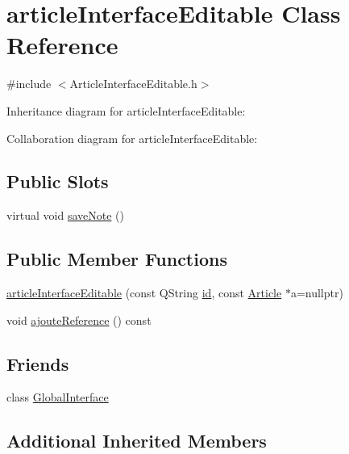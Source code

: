 \hypertarget{classarticleInterfaceEditable}{}\section{article\+Interface\+Editable Class Reference}
\label{classarticleInterfaceEditable}


{\ttfamily \#include $<$Article\+Interface\+Editable.\+h$>$}



Inheritance diagram for article\+Interface\+Editable\+:


Collaboration diagram for article\+Interface\+Editable\+:
\subsection*{Public Slots}
\begin{DoxyCompactItemize}
\item 
virtual void \hyperlink{classarticleInterfaceEditable_a0bc51181799ee0df3995e6d8b50a4403}{save\+Note} ()
\end{DoxyCompactItemize}
\subsection*{Public Member Functions}
\begin{DoxyCompactItemize}
\item 
\hyperlink{classarticleInterfaceEditable_a63073ca550a1047231b2842cd1aa6cf3}{article\+Interface\+Editable} (const Q\+String \hyperlink{classNoteInterfaceEditable_a644ed9be4e9882c784a2667748d8501d}{id}, const \hyperlink{classArticle}{Article} $\ast$a=nullptr)
\item 
void \hyperlink{classarticleInterfaceEditable_aae2c1eeb679347c2fa689f14d3e4c828}{ajoute\+Reference} () const 
\end{DoxyCompactItemize}
\subsection*{Friends}
\begin{DoxyCompactItemize}
\item 
class \hyperlink{classarticleInterfaceEditable_a2250a78aa5cceb79c3e34da3f1fe0fde}{Global\+Interface}
\end{DoxyCompactItemize}
\subsection*{Additional Inherited Members}


